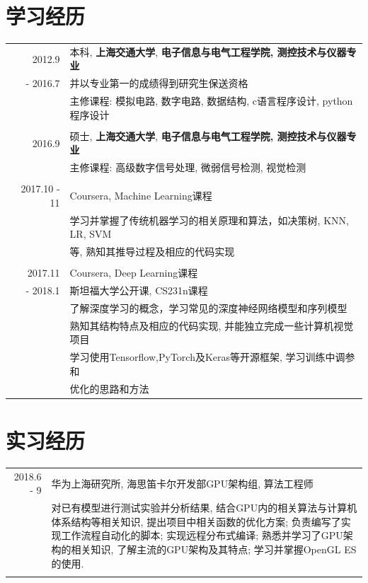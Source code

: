 \documentclass[a4paper,11pt]{article}
\begin{document}
\section{学习经历}
\begin{tabular}{rl}
\textsc{2012.9} & 本科, \textbf{上海交通大学}, \textbf{电子信息与电气工程学院, 测控技术与仪器专业}\\
\textsc{- 2016.7} & 并以专业第一的成绩得到研究生保送资格\\
& 主修课程: 模拟电路, 数字电路, 数据结构, c语言程序设计, python程序设计\\&\\
\textsc{2016.9} & 硕士, \textbf{上海交通大学}, \textbf{电子信息与电气工程学院, 测控技术与仪器专业}\\
& 主修课程: 高级数字信号处理, 微弱信号检测, 视觉检测\\&\\
\textsc{2017.10 - 11} & Coursera, Machine Learning课程\\
& 学习并掌握了传统机器学习的相关原理和算法，如决策树, KNN, LR, SVM\\
& 等, 熟知其推导过程及相应的代码实现\\&\\
\textsc{2017.11} & Coursera, Deep Learning课程\\
\textsc{- 2018.1} & 斯坦福大学公开课, CS231n课程\\
& 了解深度学习的概念，学习常见的深度神经网络模型和序列模型\\
& 熟知其结构特点及相应的代码实现, 并能独立完成一些计算机视觉项目\\
& 学习使用Tensorflow,PyTorch及Keras等开源框架, 学习训练中调参和\\
& 优化的思路和方法\\
\end{tabular}

\section{实习经历}
\begin{tabular}{r|p{11cm}}
 \textsc{2018.6 - 9} & 华为上海研究所, 海思笛卡尔开发部GPU架构组, 算法工程师 \\&\footnotesize{对已有模型进行测试实验并分析结果, 结合GPU内的相关算法与计算机体系结构等相关知识, 提出项目中相关函数的优化方案; 负责编写了实现工作流程自动化的脚本; 实现远程分布式编译; 熟悉并学习了GPU架构的相关知识, 了解主流的GPU架构及其特点; 学习并掌握OpenGL ES的使用.}\\\multicolumn{2}{c}{} \\
\end{tabular}
\end{document}
